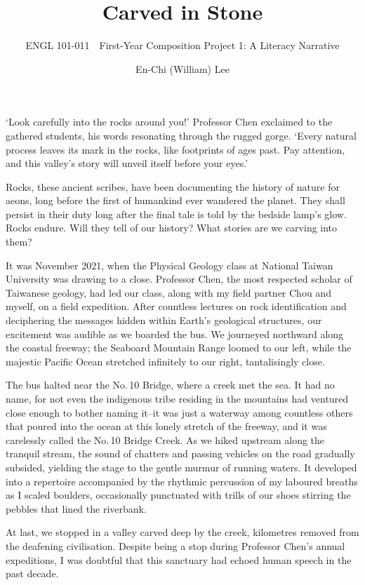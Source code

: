 \documentclass[a4paper, 12pt, mla]{homework}
\title{Carved in Stone}
\subtitle{ENGL 101-011\ \ First-Year Composition \linebreak Project 1: A Literacy Narrative}
\author{En-Chi (William) Lee}
\begin{document}
\maketitle


`Look carefully into the rocks around you!' 
Professor Chen exclaimed to the gathered students, his words resonating through the rugged gorge.  
`Every natural process leaves its mark in the rocks, like footprints of ages past. 
	Pay attention, and this valley's story will unveil itself before your eyes.' 

Rocks, these ancient scribes, have been documenting the history of nature for aeons, long before the first of humankind ever wandered the planet. 
They shall persist in their duty long after the final tale is told by the bedside lamp's glow. 
Rocks endure. 
Will they tell of our history? 
What stories are we carving into them?

It was November 2021, when the Physical Geology class at National Taiwan University was drawing to a close. 
Professor Chen, the most respected scholar of Taiwanese geology, had led our class, along with my field partner Chou and myself, on a field expedition. 
After countless lectures on rock identification and deciphering the messages hidden within Earth's geological structures, our excitement was audible as we boarded the bus. 
We journeyed northward along the coastal freeway; 
the Seaboard Mountain Range loomed to our left, while the majestic Pacific Ocean stretched infinitely to our right, tantalisingly close.

The bus halted near the No.\,10 Bridge, where a creek met the sea. 
It had no name, for not even the indigenous tribe residing in the mountains had ventured close enough to bother naming it--it was just a waterway among countless others that poured into the ocean at this lonely stretch of the freeway, and it was carelessly called the No.\,10 Bridge Creek. 
As we hiked upstream along the tranquil stream, the sound of chatters and passing vehicles on the road gradually subsided, yielding the stage to the gentle murmur of running waters. 
It developed into a repertoire accompanied by the rhythmic percussion of my laboured breaths as I scaled boulders, occasionally punctuated with trills of our shoes stirring the pebbles that lined the riverbank.

At last, we stopped in a valley carved deep by the creek, kilometres removed from the deafening civilisation. 
Despite being a stop during Professor Chen's annual expeditions, I was doubtful that this sanctuary had echoed human speech in the past decade.
\end{document}
